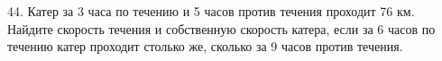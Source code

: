44. Катер за 3 часа по течению и 5 часов против течения проходит 76 км. Найдите скорость течения и собственную скорость катера, если за 6 часов по течению катер проходит столько же, сколько за 9 часов против течения.\\
